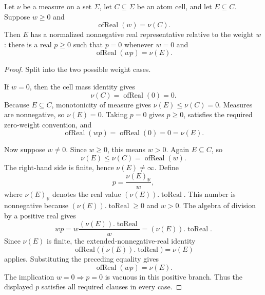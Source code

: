 \begin{helper}
Let \(\nu\) be a measure on a set \(\Sigma\), let \(C\subseteq \Sigma\) be an
atom cell, and let \(E\subseteq C\).  Suppose \(w\ge0\) and
\[
  \operatorname{ofReal}(w)=\nu(C).
\]
Then \(E\) has a normalized nonnegative real representative relative to the
weight \(w\): there is a real \(p\ge0\) such that \(p=0\) whenever \(w=0\) and
\[
  \operatorname{ofReal}(w p)=\nu(E).
\]
\end{helper}
\begin{proof}
Split into the two possible weight cases.

If \(w=0\), then the cell mass identity gives
\[
\nu(C)=\operatorname{ofReal}(0)=0.
\]
Because \(E\subseteq C\), monotonicity of measure gives
\(\nu(E)\le \nu(C)=0\).  Measures are nonnegative, so \(\nu(E)=0\).  Taking
\(p=0\) gives \(p\ge0\), satisfies the required zero-weight convention, and
\[
\operatorname{ofReal}(w p)=\operatorname{ofReal}(0)=0=\nu(E).
\]

Now suppose \(w\ne0\).  Since \(w\ge0\), this means \(w>0\).  Again
\(E\subseteq C\), so
\[
\nu(E)\le\nu(C)=\operatorname{ofReal}(w).
\]
The right-hand side is finite, hence \(\nu(E)\ne\infty\).  Define
\[
  p=\frac{\nu(E)_{\mathbb R}}{w},
\]
where \(\nu(E)_{\mathbb R}\) denotes the real value \((\nu(E)).\operatorname{toReal}\).
This number is nonnegative because \((\nu(E)).\operatorname{toReal}\ge0\) and
\(w>0\).  The algebra of division by a positive real gives
\[
  w p = w\frac{(\nu(E)).\operatorname{toReal}}{w}
      =(\nu(E)).\operatorname{toReal}.
\]
Since \(\nu(E)\) is finite, the extended-nonnegative-real identity
\[
  \operatorname{ofReal}\bigl((\nu(E)).\operatorname{toReal}\bigr)=\nu(E)
\]
applies.  Substituting the preceding equality gives
\[
\operatorname{ofReal}(w p)=\nu(E).
\]
The implication \(w=0\Rightarrow p=0\) is vacuous in this positive branch.
Thus the displayed \(p\) satisfies all required clauses in every case.
\end{proof}
